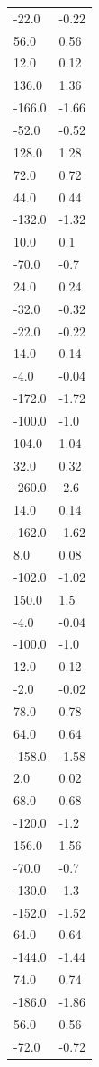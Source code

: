 \begin{longtable}{ll}
-22.0 & -0.22 \\
56.0 & 0.56 \\
12.0 & 0.12 \\
136.0 & 1.36 \\
-166.0 & -1.66 \\
-52.0 & -0.52 \\
128.0 & 1.28 \\
72.0 & 0.72 \\
44.0 & 0.44 \\
-132.0 & -1.32 \\
10.0 & 0.1 \\
-70.0 & -0.7 \\
24.0 & 0.24 \\
-32.0 & -0.32 \\
-22.0 & -0.22 \\
14.0 & 0.14 \\
-4.0 & -0.04 \\
-172.0 & -1.72 \\
-100.0 & -1.0 \\
104.0 & 1.04 \\
32.0 & 0.32 \\
-260.0 & -2.6 \\
14.0 & 0.14 \\
-162.0 & -1.62 \\
8.0 & 0.08 \\
-102.0 & -1.02 \\
150.0 & 1.5 \\
-4.0 & -0.04 \\
-100.0 & -1.0 \\
12.0 & 0.12 \\
-2.0 & -0.02 \\
78.0 & 0.78 \\
64.0 & 0.64 \\
-158.0 & -1.58 \\
2.0 & 0.02 \\
68.0 & 0.68 \\
-120.0 & -1.2 \\
156.0 & 1.56 \\
-70.0 & -0.7 \\
-130.0 & -1.3 \\
-152.0 & -1.52 \\
64.0 & 0.64 \\
-144.0 & -1.44 \\
74.0 & 0.74 \\
-186.0 & -1.86 \\
56.0 & 0.56 \\
-72.0 & -0.72 \\

\end{longtable}
